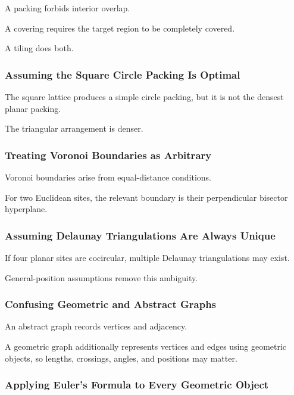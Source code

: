 A packing forbids interior overlap.

A covering requires the target region to be completely covered.

A tiling does both.

\subsubsection{Assuming the Square Circle Packing Is Optimal}

The square lattice produces a simple circle packing, but it is not the
densest planar packing.

The triangular arrangement is denser.

\subsubsection{Treating Voronoi Boundaries as Arbitrary}

Voronoi boundaries arise from equal-distance conditions.

For two Euclidean sites, the relevant boundary is their perpendicular
bisector hyperplane.

\subsubsection{Assuming Delaunay Triangulations Are Always Unique}

If four planar sites are cocircular, multiple Delaunay triangulations may
exist.

General-position assumptions remove this ambiguity.

\subsubsection{Confusing Geometric and Abstract Graphs}

An abstract graph records vertices and adjacency.

A geometric graph additionally represents vertices and edges using geometric
objects, so lengths, crossings, angles, and positions may matter.

\subsubsection{Applying Euler's Formula to Every Geometric Object}

